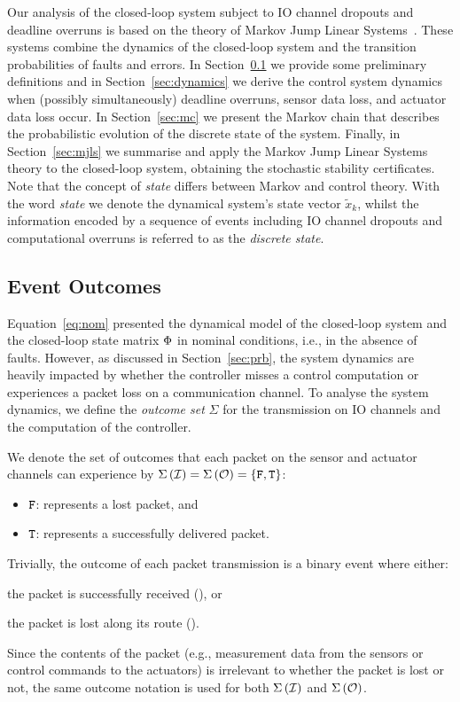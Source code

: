 Our analysis of the closed-loop system subject to IO channel dropouts and deadline overruns is based on the theory of Markov Jump Linear Systems~\cite{Costa:2005}.
These systems combine the dynamics of the closed-loop system and the transition probabilities of faults and errors.
In Section~\ref{sec:prel} we provide some preliminary definitions and in Section~\ref{sec:dynamics} we derive the control system dynamics when (possibly simultaneously) deadline overruns, sensor data loss, and actuator data loss occur.
In Section~\ref{sec:mc} we present the Markov chain that describes the probabilistic evolution of the discrete state of the system.
Finally, in Section~\ref{sec:mjls} we summarise and apply the Markov Jump Linear Systems theory to the closed-loop system, obtaining the stochastic stability certificates.
Note that the concept of \emph{state} differs between Markov and control theory.
With the word \emph{state} we denote the dynamical system's state vector $\tilde{x}_k$, whilst the information encoded by a sequence of events including IO channel dropouts and computational overruns is referred to as the \emph{discrete state}.

\subsection{Event Outcomes}%
\label{sec:prel}%
%
Equation~\eqref{eq:nom} presented the dynamical model of the closed-loop system and the closed-loop state matrix $\Phi$ in nominal conditions, i.e., in the absence of faults.
However, as discussed in Section~\ref{sec:prb}, the system dynamics are heavily impacted by whether the controller misses a control computation or experiences a packet loss on a communication channel.
To analyse the system dynamics, we define the \emph{outcome set} $\Sigma$ for the transmission on IO channels and the computation of the controller.
\begin{definition}%
    \label{def:comm}%
    We denote the set of outcomes that each packet on the sensor and actuator channels can experience by $\Sigma\left( \mathcal{I} \right) = \Sigma\left( \mathcal{O} \right) = \left\{ \texttt{F}, \texttt{T} \right\}$:
    \begin{itemize}
        \item $\texttt{F}$: represents a lost packet, and
        \item $\texttt{T}$: represents a successfully delivered packet.
    \end{itemize}
\end{definition}
%
Trivially, the outcome of each packet transmission is a binary event where either:
\begin{enumerate*}[label=(\roman*)]
    \item the packet is successfully received (\cT), or
    \item the packet is lost along its route (\cF).
\end{enumerate*}
Since the contents of the packet (e.g., measurement data from the sensors or control commands to the actuators) is irrelevant to whether the packet is lost or not, the same outcome notation is used for both $\Sigma\left( \mathcal{I} \right)$ and $\Sigma\left( \mathcal{O} \right)$.

